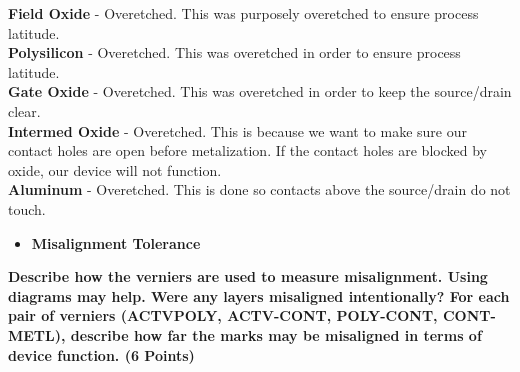 \documentclass{article}
\begin{document}
\textbf{Field Oxide} - Overetched. This was purposely overetched to ensure process latitude. \\
\textbf{Polysilicon} - Overetched.  This was overetched in order to ensure process latitude. \\
\textbf{Gate Oxide} - Overetched. This was overetched in order to keep the source/drain clear. \\
\textbf{Intermed Oxide} - Overetched. This is because we want to make sure our contact holes are open before metalization. If the contact holes are blocked by oxide, our device will not function. \\
\textbf{Aluminum} - Overetched. This is done so contacts above the source/drain do not touch. 


\begin{itemize}
\item \textbf{Misalignment Tolerance}
\end{itemize}
\textbf{Describe how the verniers are used to measure misalignment. Using diagrams may
help. Were any layers misaligned intentionally? For each pair of verniers (ACTVPOLY,
ACTV-CONT, POLY-CONT, CONT-METL), describe how far the marks
may be misaligned in terms of device function. (6 Points)} \\
\end{document}
